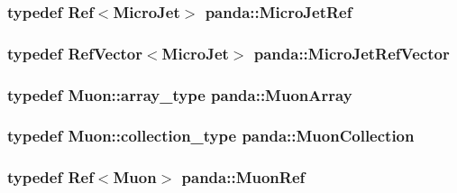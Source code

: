 \label{namespacepanda_ab230de44162d083734a6dd7d1f290908}
\hypertarget{namespacepanda_a31895cc843487337a54b7d314be09f3e}{
\subsubsection[{MicroJetRef}]{\setlength{\rightskip}{0pt plus 5cm}typedef {\bf Ref}$<${\bf MicroJet}$>$ {\bf panda::MicroJetRef}}}
\label{namespacepanda_a31895cc843487337a54b7d314be09f3e}
\hypertarget{namespacepanda_aa1c1fbda38b1106e6f19bcf0834fedd8}{
\subsubsection[{MicroJetRefVector}]{\setlength{\rightskip}{0pt plus 5cm}typedef {\bf RefVector}$<${\bf MicroJet}$>$ {\bf panda::MicroJetRefVector}}}
\label{namespacepanda_aa1c1fbda38b1106e6f19bcf0834fedd8}
\hypertarget{namespacepanda_a0418ef8ba125b4267656498f328e25a9}{
\subsubsection[{MuonArray}]{\setlength{\rightskip}{0pt plus 5cm}typedef {\bf Muon::array\_\-type} {\bf panda::MuonArray}}}
\label{namespacepanda_a0418ef8ba125b4267656498f328e25a9}
\hypertarget{namespacepanda_a72e6068ccbb985b2cc5e14fcb5b1dbc4}{
\subsubsection[{MuonCollection}]{\setlength{\rightskip}{0pt plus 5cm}typedef {\bf Muon::collection\_\-type} {\bf panda::MuonCollection}}}
\label{namespacepanda_a72e6068ccbb985b2cc5e14fcb5b1dbc4}
\hypertarget{namespacepanda_a1f824edce9f63cd83da0fdedbde27588}{
\subsubsection[{MuonRef}]{\setlength{\rightskip}{0pt plus 5cm}typedef {\bf Ref}$<${\bf Muon}$>$ {\bf panda::MuonRef}}}
\label{namespacepanda_a1f824edce9f63cd83da0fdedbde27588}
